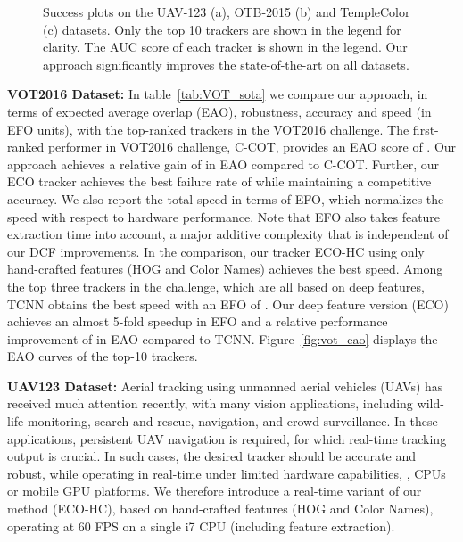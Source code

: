 \documentclass[10pt,twocolumn,letterpaper]{article}
\newcommand{\parsection}[1]{\noindent\textbf{#1:}}
\begin{document}
\begin{figure*}[!t]
	\centering \newcommand{\wid}{0.33\textwidth}\vspace{-3.5mm}
	\caption{Success plots on the UAV-123 (a), OTB-2015 (b) and TempleColor (c) datasets. Only the top 10 trackers are shown in the legend for clarity. The AUC score of each tracker is shown in the legend. Our approach significantly improves the state-of-the-art on all datasets.}\vspace{-2mm}\label{fig:success_plots}
\end{figure*}

\parsection{VOT2016 Dataset}
In table~\ref{tab:VOT_sota} we compare our approach, in terms of expected average overlap (EAO), robustness, accuracy and speed (in EFO units), with the top-ranked trackers in the VOT2016 challenge. The first-ranked performer in VOT2016 challenge, C-COT, provides an EAO score of . Our approach achieves a relative gain of  in EAO compared to C-COT. Further, our ECO tracker achieves the best failure rate of  while maintaining a competitive accuracy. We also report the total speed in terms of EFO, which normalizes the speed with respect to hardware performance. Note that EFO also takes feature extraction time into account, a major additive complexity that is independent of our DCF improvements. In the comparison, our tracker ECO-HC using only hand-crafted features (HOG and Color Names) achieves the best speed. Among the top three trackers in the challenge, which are all based on deep features, TCNN \cite{TCNN} obtains the best speed with an EFO of . Our deep feature version (ECO) achieves an almost 5-fold speedup in EFO and a relative performance improvement of  in EAO compared to TCNN. Figure~\ref{fig:vot_eao} displays the EAO curves of the top-10 trackers.

\parsection{UAV123 Dataset}
Aerial tracking using unmanned aerial vehicles (UAVs) has received much attention recently, with many vision applications, including wild-life monitoring, search and rescue, navigation, and crowd surveillance. In these applications, persistent UAV navigation is required, for which real-time tracking output is crucial. In such cases, the desired tracker should be accurate and robust, while operating in real-time under limited hardware capabilities, \eg, CPUs or mobile GPU platforms. We therefore introduce a real-time variant of our method (ECO-HC), based on hand-crafted features (HOG and Color Names), operating at 60 FPS on a single i7 CPU (including feature extraction).
\end{document}
